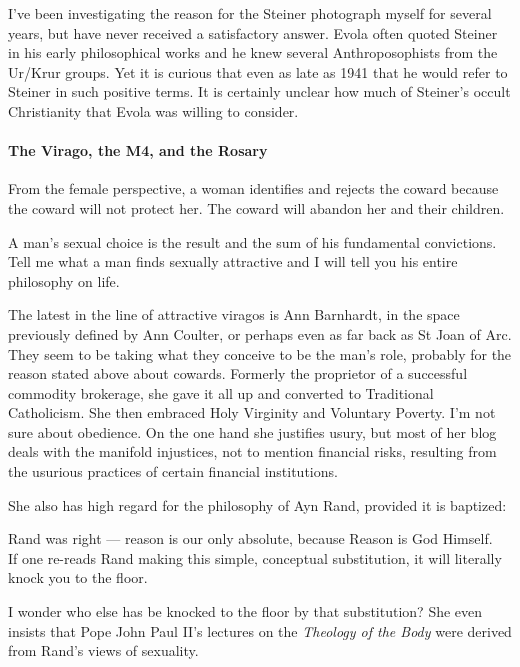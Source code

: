 I've been investigating the reason for the Steiner photograph myself for several years, but have never received a satisfactory answer. Evola often quoted Steiner in his early philosophical works and he knew several Anthroposophists from the Ur/Krur groups. Yet it is curious that even as late as 1941 that he would refer to Steiner in such positive terms. It is certainly unclear how much of Steiner's occult Christianity that Evola was willing to consider.

\paragraph{The Virago, the M4, and the Rosary}

\begin{quotex}
From the female perspective, a woman identifies and rejects the coward because the coward will not protect her. The coward will abandon her and their children. 

A man's sexual choice is the result and the sum of his fundamental convictions. Tell me what a man finds sexually attractive and I will tell you his entire philosophy on life. 

\end{quotex}
The latest in the line of attractive viragos is Ann Barnhardt, in the space previously defined by Ann Coulter, or perhaps even as far back as St Joan of Arc. They seem to be taking what they conceive to be the man's role, probably for the reason stated above about cowards. Formerly the proprietor of a successful commodity brokerage, she gave it all up and converted to Traditional Catholicism. She then embraced Holy Virginity and Voluntary Poverty. I'm not sure about obedience. On the one hand she justifies usury, but most of her blog deals with the manifold injustices, not to mention financial risks, resulting from the usurious practices of certain financial institutions.

She also has high regard for the philosophy of Ayn Rand, provided it is baptized:

\begin{quotex}
Rand was right — reason is our only absolute, because Reason is God Himself.  If one re-reads Rand making this simple, conceptual substitution, it will literally knock you to the floor. 

\end{quotex}
I wonder who else has be knocked to the floor by that substitution? She even insists that Pope John Paul II's lectures on the \emph{Theology of the Body} were derived from Rand's views of sexuality.

